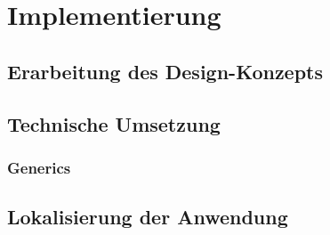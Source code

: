 \chapter{Implementierung}

\section{Erarbeitung des Design-Konzepts}

\section{Technische Umsetzung}

\subsection{Generics}

\section{Lokalisierung der Anwendung}
